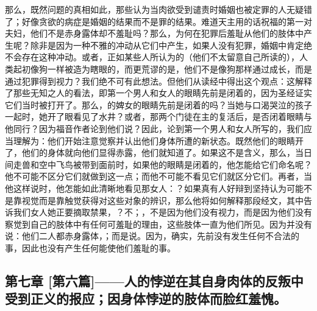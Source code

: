 那么，既然问题的真相如此，那些认为当肉欲受到谴责时婚姻也被定罪的人无疑错了；好像贪欲的病症是婚姻的结果而不是罪的结果。难道天主用的话祝福的第一对夫妇，他们不是赤身露体却不羞耻吗？那么，为何在犯罪后羞耻从他们的肢体中产生呢？除非是因为一种不雅的冲动从它们中产生，如果人没有犯罪，婚姻中肯定绝不会存在这种冲动。或者，正如某些人所认为的（他们不太留意自己所读的），人类起初像狗一样被造为瞎眼的，而更荒谬的是，他们不是像狗那样通过成长，而是通过犯罪得到视力？我们绝不可有此想法。但他们从读经中得出这个观点：这解释了那些无知之人的看法，即第一个男人和女人的眼睛先前是闭着的，因为圣经证实它们当时被打开了。那么，的婢女的眼睛先前是闭着的吗？当她与口渴哭泣的孩子一起时，她开了眼看见了水井？或者，那两个门徒在主的复活后，是否闭着眼睛与他同行？因为福音作者论到他们说？因此，论到第一个男人和女人所写的，我们应当理解为：他们开始注意觉察并认出他们身体所遭的新状态。既然他们的眼睛开了，他们的身体就向他们显得赤露，他们就知道了。如果这不是含义，那么，当日间走兽和空中飞鸟被带到面前时，如果他的眼睛是闭着的，他怎能给它们命名呢？他不可能不区分它们就做到这一点；而他不可能不看见它们就区分它们。再者，当他这样说时，他怎能如此清晰地看见那女人：？如果真有人好辩到坚持认为可能不是靠视觉而是靠触觉获得对这些对象的辨识，那么他将如何解释那段经文，其中告诉我们女人她正要摘取禁果，？不；，不是因为他们没有视力，而是因为他们没有察觉到自己的肢体中有任何可羞耻的理由，这些肢体一直为他们所见。因为并没有说：他们二人都赤身露体，；而是说。因为，确实，先前没有发生任何不合法的事，因此也没有产生任何能使他们羞耻的事。\par


\subsection{第七章 [第六篇]——人的悖逆在其自身肉体的反叛中受到正义的报应；因身体悖逆的肢体而脸红羞愧。}

